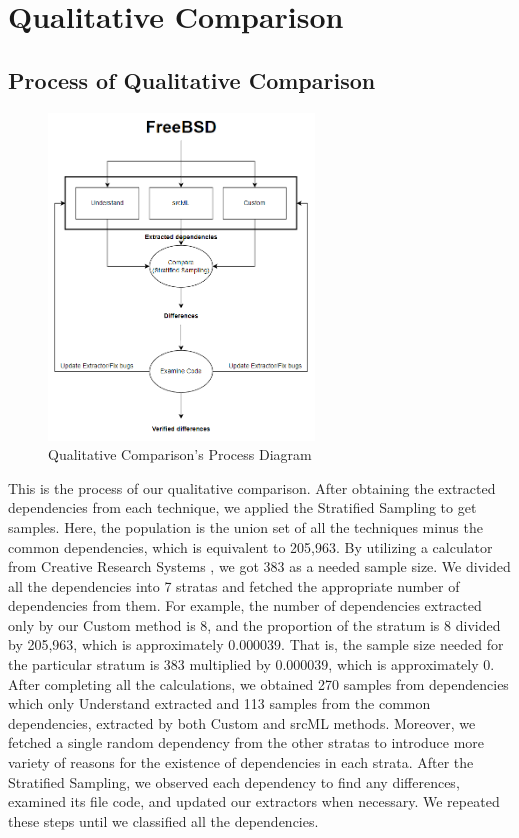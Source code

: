 \documentclass[12pt, dvipsnames, a4paper]{article}
\begin{document}
\section{Qualitative Comparison}
\subsection{Process of Qualitative Comparison}
\begin{figure}[h]
	\center
	\includegraphics[width=200pt]{assets/qualitative_process_diagram.PNG}
	\caption{Qualitative Comparison's Process Diagram}
\end{figure}
This is the process of our qualitative comparison. After obtaining the extracted dependencies from each technique, we applied the Stratified Sampling to get samples. Here, the population is the union set of all the techniques minus the common dependencies, which is equivalent to 205,963.
By utilizing a calculator from Creative Research Systems \cite{calculator}, we got 383 as a needed sample size. We divided all the dependencies into 7 stratas and fetched the appropriate number of dependencies from them.
For example, the number of dependencies extracted only by our Custom method is 8, and the proportion of the stratum is 8 divided by 205,963, which is approximately 0.000039.
That is, the sample size needed for the particular stratum is 383 multiplied by 0.000039, which is approximately 0.
After completing all the calculations, we obtained 270 samples from dependencies which only Understand extracted and 113 samples from the common dependencies, extracted by both Custom and srcML methods.
Moreover, we fetched a single random dependency from the other stratas to introduce more variety of reasons for the existence of dependencies in each strata.
After the Stratified Sampling, we observed each dependency to find any differences, examined its file code, and updated our extractors when necessary. We repeated these steps until we classified all the dependencies.
\end{document}
